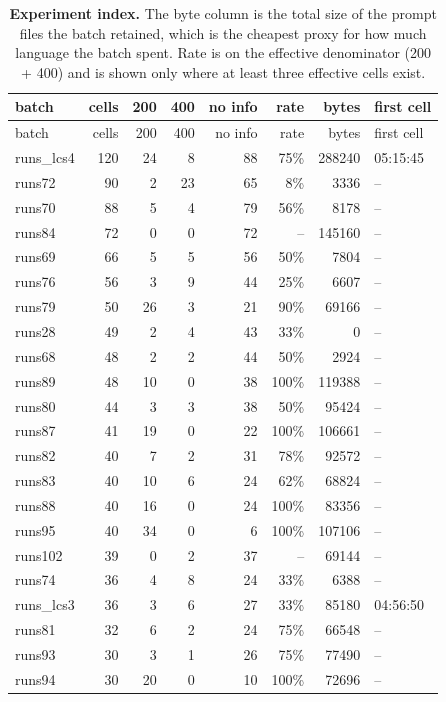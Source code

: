 \begin{longtable}{@{}lrrrrrrl@{}}
\caption{\textbf{Experiment index.} The byte column is the total size of the prompt files the batch retained, which is the cheapest proxy for how much language the batch spent. Rate is on the effective denominator (200 + 400) and is shown only where at least three effective cells exist.}\label{tab:appindex}\\
\toprule
batch & cells & 200 & 400 & no info & rate & bytes & first cell \\
\midrule
\endfirsthead
\toprule
batch & cells & 200 & 400 & no info & rate & bytes & first cell \\
\midrule
\endhead
\bottomrule
\endlastfoot
runs\_lcs4 & 120 & 24 & 8 & 88 & 75\% & 288240 & 05:15:45 \\
runs72 & 90 & 2 & 23 & 65 & 8\% & 3336 & -- \\
runs70 & 88 & 5 & 4 & 79 & 56\% & 8178 & -- \\
runs84 & 72 & 0 & 0 & 72 & -- & 145160 & -- \\
runs69 & 66 & 5 & 5 & 56 & 50\% & 7804 & -- \\
runs76 & 56 & 3 & 9 & 44 & 25\% & 6607 & -- \\
runs79 & 50 & 26 & 3 & 21 & 90\% & 69166 & -- \\
runs28 & 49 & 2 & 4 & 43 & 33\% & 0 & -- \\
runs68 & 48 & 2 & 2 & 44 & 50\% & 2924 & -- \\
runs89 & 48 & 10 & 0 & 38 & 100\% & 119388 & -- \\
runs80 & 44 & 3 & 3 & 38 & 50\% & 95424 & -- \\
runs87 & 41 & 19 & 0 & 22 & 100\% & 106661 & -- \\
runs82 & 40 & 7 & 2 & 31 & 78\% & 92572 & -- \\
runs83 & 40 & 10 & 6 & 24 & 62\% & 68824 & -- \\
runs88 & 40 & 16 & 0 & 24 & 100\% & 83356 & -- \\
runs95 & 40 & 34 & 0 & 6 & 100\% & 107106 & -- \\
runs102 & 39 & 0 & 2 & 37 & -- & 69144 & -- \\
runs74 & 36 & 4 & 8 & 24 & 33\% & 6388 & -- \\
runs\_lcs3 & 36 & 3 & 6 & 27 & 33\% & 85180 & 04:56:50 \\
runs81 & 32 & 6 & 2 & 24 & 75\% & 66548 & -- \\
runs93 & 30 & 3 & 1 & 26 & 75\% & 77490 & -- \\
runs94 & 30 & 20 & 0 & 10 & 100\% & 72696 & -- \\

\end{longtable}
